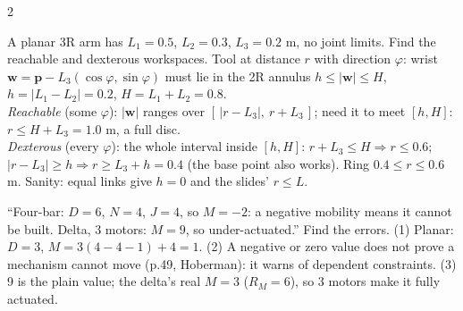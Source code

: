 \begin{multicols}{2}
\begin{examq}
A planar 3R arm has $L_1=0.5$, $L_2=0.3$, $L_3=0.2$ m, no joint limits. Find the reachable and dexterous workspaces.
\solution
Tool at distance $r$ with direction $\varphi$: wrist $\mathbf w=\mathbf p-L_3(\cos\varphi,\sin\varphi)$ must lie in the 2R annulus $h\le|\mathbf w|\le H$, $h=|L_1-L_2|=0.2$, $H=L_1+L_2=0.8$.\\
\emph{Reachable} (some $\varphi$): $|\mathbf w|$ ranges over $[\,|r-L_3|,\ r+L_3\,]$; need it to meet $[h,H]$: $r\le H+L_3=\boxed{1.0}$ m, a full disc.\\
\emph{Dexterous} (every $\varphi$): the whole interval inside $[h,H]$: $r+L_3\le H\Rightarrow r\le0.6$; $|r-L_3|\ge h\Rightarrow r\ge L_3+h=0.4$ (the base point also works). Ring $\boxed{0.4\le r\le0.6}$ m. Sanity: equal links give $h=0$ and the slides' $r\le L$. \chk
\end{examq}

\begin{examq}
``Four-bar: $D=6$, $N=4$, $J=4$, so $M=-2$: a negative mobility means it cannot be built. Delta, 3 motors: $M=9$, so under-actuated.'' Find the errors.
\solution
(1) Planar: $D=3$, $M=3(4-4-1)+4=1$. (2) A negative or zero value does not prove a mechanism cannot move (p.49, Hoberman): it warns of dependent constraints. (3) 9 is the plain value; the delta's real $M=3$ ($R_M=6$), so 3 motors make it fully actuated. \chk
\end{examq}
\end{multicols}

